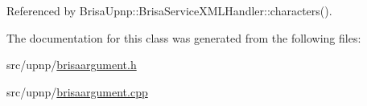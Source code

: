 Referenced by BrisaUpnp::BrisaServiceXMLHandler::characters().

The documentation for this class was generated from the following files:\begin{DoxyCompactItemize}
\item 
src/upnp/\hyperlink{brisaargument_8h}{brisaargument.h}\item 
src/upnp/\hyperlink{brisaargument_8cpp}{brisaargument.cpp}\end{DoxyCompactItemize}
